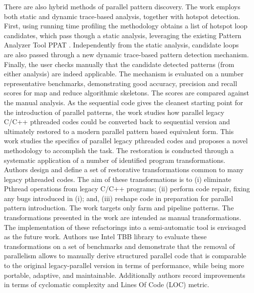 \quad There are also hybrid methods of parallel pattern discovery. The work \cite{9092377} employs both static and dynamic trace-based analysis, together with hotspot detection. First, using running time profiling the methodology obtains a list of hotspot loop candidates, which pass though a static analysis, leveraging the existing Pattern Analyzer Tool PPAT \cite{skeletons-static}. Independently from the static analysis, candidate loops are also passed through a new dynamic trace-based pattern detection mechanism. Finally, the user checks manually that the candidate detected patterns (from either analysis) are indeed applicable. The mechanism is evaluated on a number representative benchmarks, demonstrating good accuracy, precision and recall scores for map and reduce algorithmic skeletons. The scores are compared against the manual analysis.\newline\null
\quad As the sequential code gives the cleanest starting point for the introduction of parallel patterns, the work \cite{} studies how parallel legacy C/C++ pthreaded codes could be converted back to sequential version and ultimately restored to a modern parallel pattern based equivalent form. This work studies the specifics of parallel legacy pthreaded codes and proposes a novel methodology to accomplish the task. The restoration is conducted through a systematic application of a number of identified program transformations. Authors design and define a set of restorative transformations common to many legacy pthreaded codes. The aim of these transformations is to (i) eliminate Pthread operations from legacy C/C++ programs; (ii) perform code repair, fixing any bugs introduced in (i); and, (iii) reshape code in preparation for parallel pattern introduction. The work targets only farm and pipeline patterns. The transformations presented in the work are intended as manual transformations. The implementation of these refactorings into a semi-automatic tool is envisaged as the future work. Authors use Intel TBB library to evaluate these transformations on a set of benchmarks and demonstrate that the removal of parallelism allows to manually derive structured parallel code that is comparable to the original legacy-parallel version in terms of performance, while being more portable, adaptive, and maintainable. Additionally authors record improvements in terms of cyclomatic complexity \cite{} and Lines Of Code (LOC) metric.

